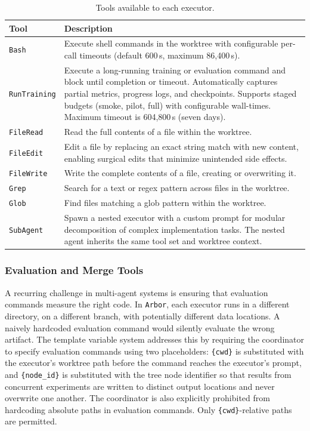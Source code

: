 \documentclass{llmxive}
\providecommand{\arbor}{\texttt{Arbor}}
\providecommand{\arraystretch}{1.08}
\begin{document}
\begin{table}[!htbp]
\centering
\small
\setlength{\tabcolsep}{4pt}
\renewcommand{\arraystretch}{1.08}
\begin{tabularx}{\linewidth}{>{\arraybackslash}p{2.8cm}>{\arraybackslash}X}
\toprule
\textbf{Tool} & \textbf{Description} \\
\midrule
\texttt{Bash} & Execute shell commands in the worktree with configurable per-call timeouts (default 600\,s, maximum 86{,}400\,s). \\
\texttt{RunTraining} & Execute a long-running training or evaluation command and block until completion or timeout. Automatically captures partial metrics, progress logs, and checkpoints. Supports staged budgets (smoke, pilot, full) with configurable wall-times. Maximum timeout is 604{,}800\,s (seven days). \\
\texttt{FileRead} & Read the full contents of a file within the worktree. \\
\texttt{FileEdit} & Edit a file by replacing an exact string match with new content, enabling surgical edits that minimize unintended side effects. \\
\texttt{FileWrite} & Write the complete contents of a file, creating or overwriting it. \\
\texttt{Grep} & Search for a text or regex pattern across files in the worktree. \\
\texttt{Glob} & Find files matching a glob pattern within the worktree. \\
\texttt{SubAgent} & Spawn a nested executor with a custom prompt for modular decomposition of complex implementation tasks. The nested agent inherits the same tool set and worktree context. \\
\bottomrule
\end{tabularx}
\caption{Tools available to each executor.}
\label{tab:sub-agent-tools}
\end{table}

\subsubsection{Evaluation and Merge Tools}
\label{app:evaluation-merge-tools}

A recurring challenge in multi-agent systems is ensuring that evaluation
commands measure the right code. In \arbor{}, each executor runs in a
different directory, on a different branch, with potentially different data
locations. A naively hardcoded evaluation command would silently evaluate
the wrong artifact. The template variable system addresses this by requiring
the coordinator to specify evaluation commands using two placeholders:
\texttt{\{cwd\}} is substituted with the executor's worktree path before
the command reaches the executor's prompt, and \texttt{\{node\_id\}} is
substituted with the tree node identifier so that results from concurrent
experiments are written to distinct output locations and never overwrite
one another. The coordinator is also explicitly prohibited from hardcoding
absolute paths in evaluation commands. Only \texttt{\{cwd\}}-relative
paths are permitted.
\end{document}
